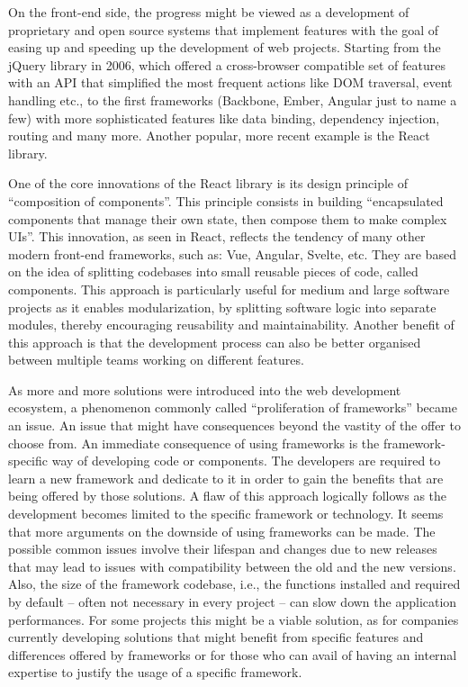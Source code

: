 On the front-end side, the progress might be viewed as a development of proprietary and open source systems that implement features with the goal of easing up and speeding up the development of web projects. Starting from the jQuery library in 2006, which offered a cross-browser compatible set of features with an API that simplified the most frequent actions like DOM traversal, event handling etc., to the first frameworks (Backbone, Ember, Angular just to name a few) with more sophisticated features like data binding, dependency injection, routing and many more. Another popular, more recent example is the React library.

One of the core innovations of the React library is its design principle of “composition of components”. This principle consists in building “encapsulated components that manage their own state, then compose them to make complex UIs”. This innovation, as seen in React, reflects the tendency of many other modern front-end frameworks, such as: Vue, Angular, Svelte, etc. They are based on the idea of splitting codebases into small reusable pieces of code, called components. This approach is particularly useful for medium and large software projects as it enables modularization, by splitting software logic into separate modules, thereby encouraging reusability and maintainability. Another benefit of this approach is that the development process can also be better organised between multiple teams working on different features. 

As more and more solutions were introduced into the web development ecosystem, a phenomenon commonly called “proliferation of frameworks” became an issue. An issue that might have consequences beyond the vastity of the offer to choose from.
An immediate consequence of using frameworks is the framework-specific way of developing code or components. The developers are required to learn a new framework and dedicate to it in order to gain the benefits that are being offered by those solutions. A flaw of this approach logically follows as the development becomes limited to the specific framework or technology. It seems that more arguments on the downside of using frameworks can be made. The possible common issues involve their lifespan and changes due to new releases that may lead to issues with compatibility between the old and the new versions. Also, the size of the framework codebase, i.e., the functions installed and required by default – often not necessary in every project – can slow down the application performances.
For some projects this might be a viable solution, as for companies currently developing solutions that might benefit from specific features and differences offered by frameworks or for those who can avail of having an internal expertise to justify the usage of a specific framework.


